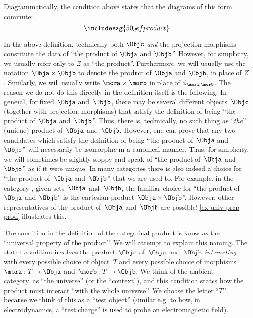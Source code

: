 \begin{remark}
    Diagrammatically, the condition above states that the diagrams of this form commute:
    \begin{equation}
        \includesag{50_defproduct}
    \end{equation}
\end{remark}

\begin{remark}
    \label{prod unique up to iso}
    In the above definition, technically both $\Objc$ \emph{and} the projection morphisms constitute the data of ``the product of $\Obja$ and $\Objb$''. However, for simplicity, we usually refer only to $Z$ as ``the product''. Furthermore, we will usually use the notation $\Obja \times \Objb$ to denote the product of $\Obja$ and $\Objb$, in place of $Z$. Similarly, we will usually write $\mora \times \morb$ in place of $\phi_{\mora, \morb}$. The reason we do not do this directly in the definition itself is the following. In general, for fixed~$\Obja$ and~$\Objb$, there may be several different objects~$\Objc$ (together with projection morphisms) that satisfy the definition of being ``the product of~$\Obja$ and~$\Objb$''. Thus, there is, technically, no such thing as ``\emph{the}'' (unique) product of~$\Obja$ and~$\Objb$. However, one can prove that any two candidates which satisfy the definition of being ``the product of~$\Obja$ and~$\Objb$'' will necessarily be isomorphic in a canonical manner. Thus, for simplicity, we will sometimes be slightly sloppy and speak of ``the product of~$\Obja$ and~$\Objb$'' as if it were unique. In many categories there is also indeed a choice for ``the product of~$\Obja$ and~$\Objb$'' that we are used to. For example, in the category \Set, given sets~$\Obja$ and~$\Objb$, the familiar choice for ``the product of~$\Obja$ and~$\Objb$'' is the cartesian product~$\Obja \times \Objb$''. However, other representatives of the product of~$\Obja$ and~$\Objb$ are possible! \cref{ex univ prop prod} illustrates this.
\end{remark}

\begin{remark}
    The condition in the definition of the categorical product is know as the ``universal property of the product''. We will attempt to explain this naming. The stated condition involves the product~$\Objc$ of~$\Obja$ and~$\Objb$ \emph{interacting} with every possible choice of object~$T$ and every possible choice of morphisms~$\mora : T \to \Obja$ and~$\morb: T \to \Objb$. We think of the ambient category~\CatC as ``the universe'' (or the ``context''), and this condition states how the product must interact ``with the whole universe''.
    We choose the letter ``$T$'' because we think of this as a ``test object'' (similar e.g. to how, in electrodynamics, a ``test charge'' is used to probe an electromagnetic field).
\end{remark}


